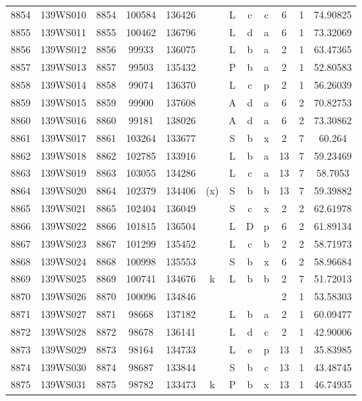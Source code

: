 \begin{tabular}{|*{12}{c|}}
8854 & 139WS010 & 8854 & 100584 & 136426 &  & L & c & c & 6 & 1 & 74.90825 \\ 
8855 & 139WS011 & 8855 & 100462 & 136796 &  & L & d & a & 6 & 1 & 73.32069 \\ 
8856 & 139WS012 & 8856 & 99933 & 136075 &  & L & b & a & 2 & 1 & 63.47365 \\ 
8857 & 139WS013 & 8857 & 99503 & 135432 &  & P & b & a & 2 & 1 & 52.80583 \\ 
8858 & 139WS014 & 8858 & 99074 & 136370 &  & L & c & p & 2 & 1 & 56.26039 \\ 
8859 & 139WS015 & 8859 & 99900 & 137608 &  & A & d & a & 6 & 2 & 70.82753 \\ 
8860 & 139WS016 & 8860 & 99181 & 138026 &  & A & d & a & 6 & 2 & 73.30862 \\ 
8861 & 139WS017 & 8861 & 103264 & 133677 &  & S & b & x & 2 & 7 & 60.264 \\ 
8862 & 139WS018 & 8862 & 102785 & 133916 &  & L & b & a & 13 & 7 & 59.23469 \\ 
8863 & 139WS019 & 8863 & 103055 & 134286 &  & L & c & a & 13 & 7 & 58.7053 \\ 
8864 & 139WS020 & 8864 & 102379 & 134406 & (x) & S & b & b & 13 & 7 & 59.39882 \\ 
8865 & 139WS021 & 8865 & 102404 & 136049 &  & S & c & x & 2 & 2 & 62.61978 \\ 
8866 & 139WS022 & 8866 & 101815 & 136504 &  & L & D & p & 6 & 2 & 61.89134 \\ 
8867 & 139WS023 & 8867 & 101299 & 135452 &  & L & c & b & 2 & 2 & 58.71973 \\ 
8868 & 139WS024 & 8868 & 100998 & 135553 &  & S & b & x & 6 & 2 & 58.96684 \\ 
8869 & 139WS025 & 8869 & 100741 & 134676 & k & L & b & b & 2 & 7 & 51.72013 \\ 
8870 & 139WS026 & 8870 & 100096 & 134846 &  &  &  &  & 2 & 1 & 53.58303 \\ 
8871 & 139WS027 & 8871 & 98668 & 137182 &  & L & b & a & 2 & 1 & 60.09477 \\ 
8872 & 139WS028 & 8872 & 98678 & 136141 &  & L & d & c & 2 & 1 & 42.90006 \\ 
8873 & 139WS029 & 8873 & 98164 & 134733 &  & L & e & p & 13 & 1 & 35.83985 \\ 
8874 & 139WS030 & 8874 & 98687 & 133844 &  & S & b & c & 13 & 1 & 43.48745 \\ 
8875 & 139WS031 & 8875 & 98782 & 133473 & k & P & b & x & 13 & 1 & 46.74935 \\ 

\end{tabular}
